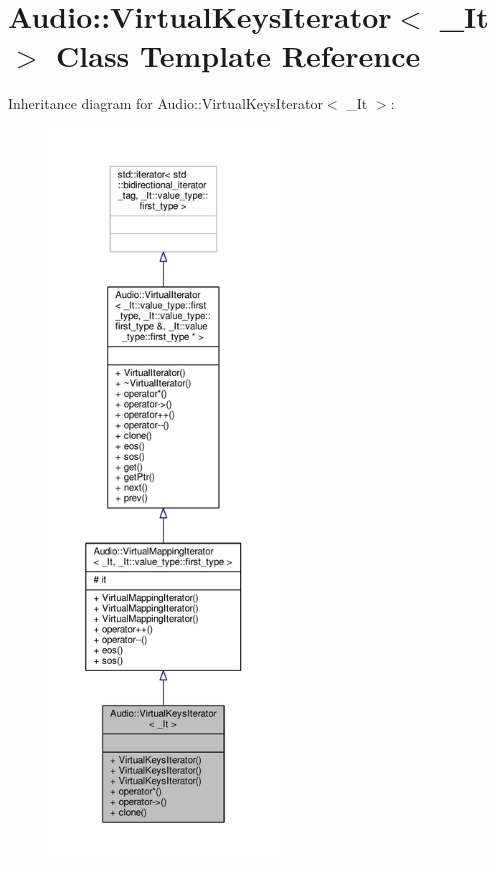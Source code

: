 \hypertarget{classAudio_1_1VirtualKeysIterator}{}\section{Audio\+:\+:Virtual\+Keys\+Iterator$<$ \+\_\+\+It $>$ Class Template Reference}
\label{classAudio_1_1VirtualKeysIterator}


Inheritance diagram for Audio\+:\+:Virtual\+Keys\+Iterator$<$ \+\_\+\+It $>$\+:
\nopagebreak
\begin{figure}[H]
\begin{center}
\leavevmode
\includegraphics[height=550pt]{df/dd4/classAudio_1_1VirtualKeysIterator__inherit__graph}
\end{center}
\end{figure}


